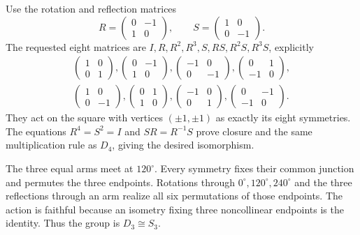 Use the rotation and reflection matrices
\[R=\begin{pmatrix}0&-1\\1&0\end{pmatrix},\qquad S=\begin{pmatrix}1&0\\0&-1\end{pmatrix}.\]
The requested eight matrices are $I,R,R^2,R^3,S,RS,R^2S,R^3S$, explicitly
\[\begin{gathered}
\begin{pmatrix}1&0\\0&1\end{pmatrix},\begin{pmatrix}0&-1\\1&0\end{pmatrix},
\begin{pmatrix}-1&0\\0&-1\end{pmatrix},\begin{pmatrix}0&1\\-1&0\end{pmatrix},\\
\begin{pmatrix}1&0\\0&-1\end{pmatrix},\begin{pmatrix}0&1\\1&0\end{pmatrix},
\begin{pmatrix}-1&0\\0&1\end{pmatrix},\begin{pmatrix}0&-1\\-1&0\end{pmatrix}.
\end{gathered}\]
They act on the square with vertices $(\pm1,\pm1)$ as exactly its eight symmetries. The equations $R^4=S^2=I$ and $SR=R^{-1}S$ prove closure and the same multiplication rule as $D_4$, giving the desired isomorphism.

The three equal arms meet at $120^\circ$. Every symmetry fixes their common junction and permutes the three endpoints. Rotations through $0^\circ,120^\circ,240^\circ$ and the three reflections through an arm realize all six permutations of those endpoints. The action is faithful because an isometry fixing three noncollinear endpoints is the identity. Thus the group is $D_3\cong S_3$.

